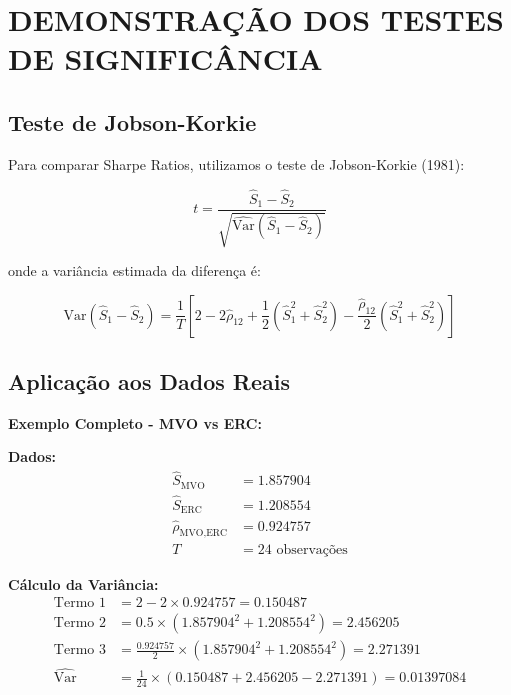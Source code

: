 \section{DEMONSTRAÇÃO DOS TESTES DE SIGNIFICÂNCIA}

\subsection{Teste de Jobson-Korkie}

Para comparar Sharpe Ratios, utilizamos o teste de Jobson-Korkie (1981):

\begin{equation}
t = \frac{\hat{S}_1 - \hat{S}_2}{\sqrt{\widehat{\text{Var}}(\hat{S}_1 - \hat{S}_2)}}
\end{equation}

onde a variância estimada da diferença é:

\begin{equation}
\widehat{\text{Var}}(\hat{S}_1 - \hat{S}_2) = \frac{1}{T}\left[2 - 2\hat{\rho}_{12} + \frac{1}{2}(\hat{S}_1^2 + \hat{S}_2^2) - \frac{\hat{\rho}_{12}}{2}(\hat{S}_1^2 + \hat{S}_2^2)\right]
\end{equation}

\subsection{Aplicação aos Dados Reais}

\textbf{Exemplo Completo - MVO vs ERC:}

\textbf{Dados:}
\begin{align}
\hat{S}_{\text{MVO}} &= 1.857904 \\
\hat{S}_{\text{ERC}} &= 1.208554 \\
\hat{\rho}_{\text{MVO,ERC}} &= 0.924757 \\
T &= 24 \text{ observações}
\end{align}

\textbf{Cálculo da Variância:}
\begin{align}
\text{Termo 1} &= 2 - 2 \times 0.924757 = 0.150487 \\
\text{Termo 2} &= 0.5 \times (1.857904^2 + 1.208554^2) = 2.456205 \\
\text{Termo 3} &= \frac{0.924757}{2} \times (1.857904^2 + 1.208554^2) = 2.271391 \\
\widehat{\text{Var}} &= \frac{1}{24} \times (0.150487 + 2.456205 - 2.271391) = 0.01397084
\end{align}


